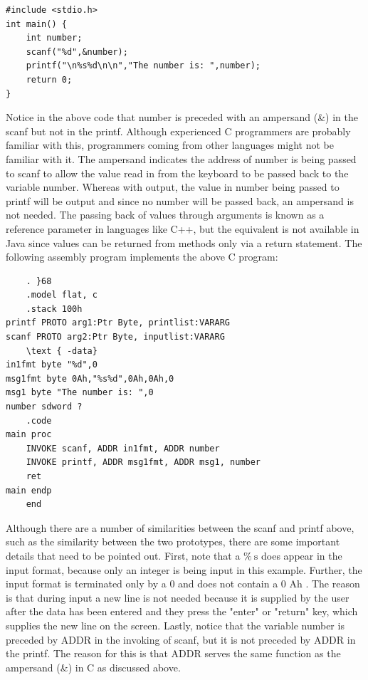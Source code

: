 \documentclass[10pt]{article}
\begin{document}
\begin{verbatim}
#include <stdio.h>
int main() {
    int number;
    scanf("%d",&number);
    printf("\n%s%d\n\n","The number is: ",number);
    return 0;
}
\end{verbatim}

Notice in the above code that number is preceded with an ampersand (\&) in the scanf but not in the printf. Although experienced C programmers are probably familiar with this, programmers coming from other languages might not be familiar with it. The ampersand indicates the address of number is being passed to scanf to allow the value read in from the keyboard to be passed back to the variable number. Whereas with output, the value in number being passed to printf will be output and since no number will be passed back, an ampersand is not needed. The passing back of values through arguments is known as a reference parameter in languages like C++, but the equivalent is not available in Java since values can be returned from methods only via a return statement. The following assembly program implements the above C program:

\begin{verbatim}
    . }68
    .model flat, c
    .stack 100h
printf PROTO arg1:Ptr Byte, printlist:VARARG
scanf PROTO arg2:Ptr Byte, inputlist:VARARG
    \text { -data}
in1fmt byte "%d",0
msg1fmt byte 0Ah,"%s%d",0Ah,0Ah,0
msg1 byte "The number is: ",0
number sdword ?
    .code
main proc
    INVOKE scanf, ADDR in1fmt, ADDR number
    INVOKE printf, ADDR msg1fmt, ADDR msg1, number
    ret
main endp
    end
\end{verbatim}

Although there are a number of similarities between the scanf and printf above, such as the similarity between the two prototypes, there are some important details that need to be pointed out. First, note that a $\% \mathrm{~s}$ does appear in the input format, because only an integer is being input in this example. Further, the input format is terminated only by a 0 and does not contain a 0 Ah . The reason is that during input a new line is not needed because it is supplied by the user after the data has been entered and they press the "enter" or "return" key, which supplies the new line on the screen. Lastly, notice that the variable number is preceded by ADDR in the invoking of scanf, but it is not preceded by ADDR in the printf. The reason for this is that ADDR serves the same function as the ampersand (\&) in C as discussed above.
\end{document}
